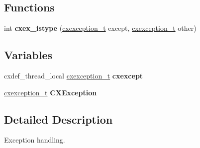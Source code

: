 \subsection*{Functions}
\begin{DoxyCompactItemize}
\item 
\mbox{\label{a00011_a12358a045dfda6e1f68e043ee6fd0f4b}} 
int {\bfseries cxex\+\_\+istype} (\hyperlink{a00048}{cxexception\+\_\+t} except, \hyperlink{a00048}{cxexception\+\_\+t} other)
\end{DoxyCompactItemize}
\subsection*{Variables}
\begin{DoxyCompactItemize}
\item 
\mbox{\label{a00011_afd15a1d98ac79a209f475756608bf619}} 
cxdef\+\_\+thread\+\_\+local \hyperlink{a00048}{cxexception\+\_\+t} {\bfseries cxexcept}
\item 
\mbox{\label{a00011_ac73de8289fd5bc03032a3725c501dca1}} 
\hyperlink{a00048}{cxexception\+\_\+t} {\bfseries C\+X\+Exception}
\end{DoxyCompactItemize}


\subsection{Detailed Description}
Exception handling. 

